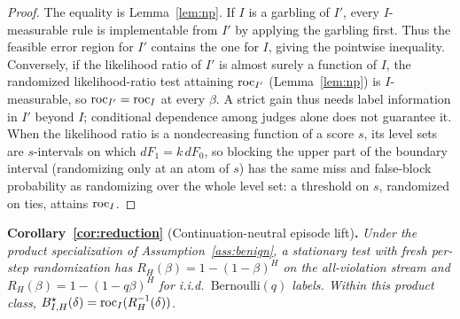 \begin{proof}
The equality is Lemma~\ref{lem:np}. If $I$ is a garbling of $I'$, every
$I$-measurable rule is implementable from $I'$ by applying the garbling first.
Thus the feasible error region for $I'$ contains the one for $I$, giving the
pointwise inequality. Conversely, if the likelihood ratio of $I'$ is almost surely a
function of $I$, the randomized likelihood-ratio test attaining $\mathrm{roc}_{I'}$
(Lemma~\ref{lem:np}) is $I$-measurable, so $\mathrm{roc}_{I'}=\mathrm{roc}_I$ at every $\beta$. A strict gain
thus needs label information in $I'$ beyond $I$; conditional dependence among judges alone
does not guarantee it. When the likelihood ratio is a nondecreasing function of a score $s$, its
level sets are $s$-intervals on which $dF_1=k\,dF_0$, so blocking the upper part of the boundary
interval (randomizing only at an atom of $s$) has the same miss and false-block probability as
randomizing over the whole level set: a threshold on $s$, randomized on ties, attains $\mathrm{roc}_I$.
\end{proof}

\medskip
\noindent\textbf{Corollary~\ref{cor:reduction}} (Continuation-neutral episode lift)\textbf{.}
\emph{Under the product specialization of Assumption~\ref{ass:benign}, a stationary
test with fresh per-step randomization has $R_H(\beta)=1-(1-\beta)^H$ on the
all-violation stream and $R_H(\beta)=1-(1-q\beta)^H$ for i.i.d.\
$\mathrm{Bernoulli}(q)$ labels. Within this product class,
$B_{I,H}^\star(\delta)=\mathrm{roc}_I(R_H^{-1}(\delta))$.}

